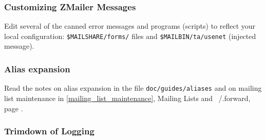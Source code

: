 \subsubsection{Customizing ZMailer Messages}

Edit several of the canned error messages and programs (scripts)
to reflect your local configuration: {\tt \$MAILSHARE/forms/} files and
{\tt \$MAILBIN/ta/usenet} (injected message).




\subsubsection{Alias expansion}

Read the notes on alias expansion in the file {\tt doc/guides/aliases} and
on mailing list maintenance in \ref{mailing_list_maintenance}, 
Mailing Lists and ~/.forward, page \pageref{mailing_list_maintenance}.




\subsubsection{Trimdown of Logging}

